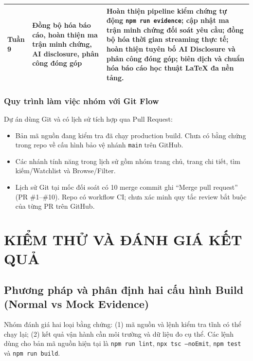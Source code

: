 \documentclass[12pt,a4paper]{extarticle}
\begin{document}
\begin{table}[H]
\begin{tabularx}{\textwidth}{>{\centering\arraybackslash}p{1.6cm}>{\raggedright\arraybackslash}p{3.2cm}>{\raggedright\arraybackslash}X}
\textbf{Tuần 9} & Đồng bộ hóa báo cáo, hoàn thiện ma trận minh chứng, AI disclosure, phân công đóng góp & Hoàn thiện pipeline kiểm chứng tự động \texttt{npm run evidence}; cập nhật ma trận minh chứng đối soát yêu cầu; đồng bộ hóa thời gian streaming thực tế; hoàn thiện tuyên bố AI Disclosure và phân công đóng góp; biên dịch và chuẩn hóa báo cáo học thuật \LaTeX{} đa nền tảng. \\
\bottomrule
\end{tabularx}
\end{table}

\subsubsection{Quy trình làm việc nhóm với Git Flow}
Dự án dùng Git và có lịch sử tích hợp qua Pull Request:
\begin{itemize}[noitemsep]
    \item Bản mã nguồn đang kiểm tra đã chạy production build. Chưa có bằng chứng trong repo về cấu hình bảo vệ nhánh \texttt{main} trên GitHub.
    \item Các nhánh tính năng trong lịch sử gồm nhóm trang chủ, trang chi tiết, tìm kiếm/Watchlist và Browse/Filter.
    \item Lịch sử Git tại mốc đối soát có 10 merge commit ghi ``Merge pull request'' (PR \#1--\#10). Repo có workflow CI; chưa xác minh quy tắc review bắt buộc của từng PR trên GitHub.
\end{itemize}

\newpage
\section{KIỂM THỬ VÀ ĐÁNH GIÁ KẾT QUẢ}

\subsection{Phương pháp và phân định hai cấu hình Build (Normal vs Mock Evidence)}
Nhóm đánh giá hai loại bằng chứng: (1) mã nguồn và lệnh kiểm tra tĩnh có thể chạy lại; (2) kết quả vận hành cần môi trường và dữ liệu đo cụ thể. Các lệnh dùng cho bản mã nguồn hiện tại là \texttt{npm run lint}, \texttt{npx tsc --noEmit}, \texttt{npm test} và \texttt{npm run build}.
\end{document}
